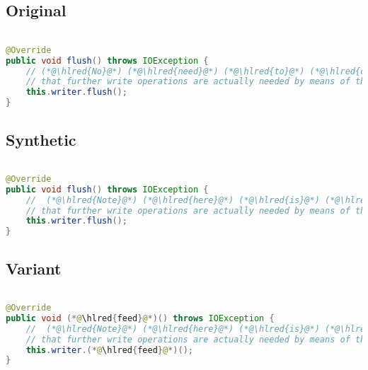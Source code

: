 \documentclass[11pt]{article}
\DeclareRobustCommand{\hlred}[1]{{\sethlcolor{YellowOrange}\hl{#1}}}
\begin{document}
\subsection{Original}
\begin{lstlisting}[language=java]

@Override
public void flush() throws IOException {
    // (*@\hlred{No}@*) (*@\hlred{need}@*) (*@\hlred{to}@*) (*@\hlred{control}@*) (*@\hlred{overflow}@*) (*@\hlred{here.}@*) (*@\hlred{The}@*) (*@\hlred{fact}@*) (*@\hlred{that}@*) (*@\hlred{this}@*) (*@\hlred{has}@*) (*@\hlred{overflow}@*) (*@\hlred{will}@*) (*@\hlred{be}@*) (*@\hlred{used}@*) (*@\hlred{as}@*) (*@\hlred{a}@*) (*@\hlred{flag}@*) to(*@\hlred{ determine}@*)
    // that further write operations are actually needed by means of the isOverflown() method.
    this.writer.flush();
}
\end{lstlisting}
\subsection{Synthetic}

\begin{lstlisting}[language=java]

@Override
public void flush() throws IOException {
    //  (*@\hlred{Note}@*) (*@\hlred{here}@*) (*@\hlred{is}@*) (*@\hlred{an}@*) (*@\hlred{exception}@*) (*@\hlred{that}@*) (*@\hlred{may}@*) (*@\hlred{result}@*) (*@\hlred{when}@*) (*@\hlred{the}@*) (*@\hlred{writer}@*) (*@\hlred{checks}@*) (*@\hlred{whether}@*) (*@\hlred{there}@*) (*@\hlred{exist}@*) (*@\hlred{problems}@*) (*@\hlred{or}@*) (*@\hlred{otherwise}@*) to
    // that further write operations are actually needed by means of the isOverflown() method.
    this.writer.flush();
}
\end{lstlisting}

\subsection{Variant}

\begin{lstlisting}[language=java]

@Override
public void (*@\hlred{feed}@*)() throws IOException {
    //  (*@\hlred{Note}@*) (*@\hlred{here}@*) (*@\hlred{is}@*) (*@\hlred{an}@*) (*@\hlred{exception}@*) (*@\hlred{because}@*) (*@\hlred{there}@*) (*@\hlred{isn't}@*) (*@\hlred{enough}@*) (*@\hlred{logic}@*) (*@\hlred{in}@*) (*@\hlred{it}@*) (*@\hlred{and}@*) (*@\hlred{thus}@*) (*@\hlred{no}@*) (*@\hlred{assumption}@*) (*@\hlred{made}@*) (*@\hlred{there}@*)
    // that further write operations are actually needed by means of the isOverflown() method.
    this.writer.(*@\hlred{feed}@*)();
}
\end{lstlisting}
\end{document}
